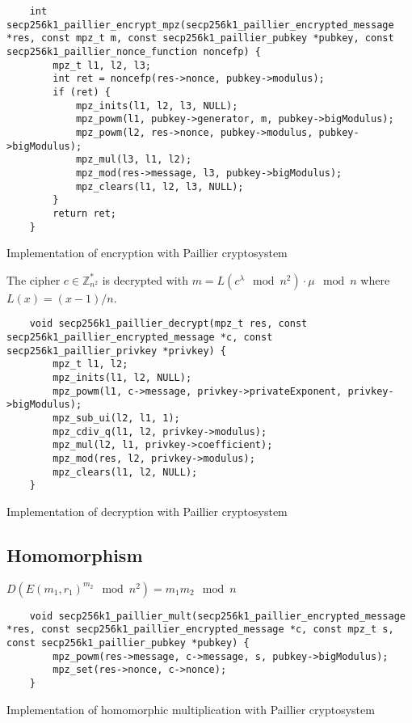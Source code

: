 \begin{listing}
  \begin{verbatim}
    int secp256k1_paillier_encrypt_mpz(secp256k1_paillier_encrypted_message *res, const mpz_t m, const secp256k1_paillier_pubkey *pubkey, const secp256k1_paillier_nonce_function noncefp) {
        mpz_t l1, l2, l3;
        int ret = noncefp(res->nonce, pubkey->modulus);
        if (ret) {
            mpz_inits(l1, l2, l3, NULL);
            mpz_powm(l1, pubkey->generator, m, pubkey->bigModulus);
            mpz_powm(l2, res->nonce, pubkey->modulus, pubkey->bigModulus);
            mpz_mul(l3, l1, l2);
            mpz_mod(res->message, l3, pubkey->bigModulus);
            mpz_clears(l1, l2, l3, NULL);
        }
        return ret;
    }
  \end{verbatim}
	\caption{Implementation of encryption with Paillier cryptosystem}
	\label{lst:implEncryptPaillier}
\end{listing}

The cipher $c \in \mathbb{Z}_{n^2}^*$ is decrypted with
$m = L(c^{\lambda} \mod n^2) \cdot \mu \mod n$ where $L(x) = (x - 1) / n$.

\begin{listing}
  \begin{verbatim}
    void secp256k1_paillier_decrypt(mpz_t res, const secp256k1_paillier_encrypted_message *c, const secp256k1_paillier_privkey *privkey) {
        mpz_t l1, l2;
        mpz_inits(l1, l2, NULL);
        mpz_powm(l1, c->message, privkey->privateExponent, privkey->bigModulus);
        mpz_sub_ui(l2, l1, 1);
        mpz_cdiv_q(l1, l2, privkey->modulus);
        mpz_mul(l2, l1, privkey->coefficient);
        mpz_mod(res, l2, privkey->modulus);
        mpz_clears(l1, l2, NULL);
    }
  \end{verbatim}
	\caption{Implementation of decryption with Paillier cryptosystem}
	\label{lst:implDecryptPaillier}
\end{listing}

\subsection{Homomorphism}

$D(E(m_1, r_1)^{m_2} \mod n^2) = m_1 m_2 \mod n$

\begin{listing}
  \begin{verbatim}
    void secp256k1_paillier_mult(secp256k1_paillier_encrypted_message *res, const secp256k1_paillier_encrypted_message *c, const mpz_t s, const secp256k1_paillier_pubkey *pubkey) {
        mpz_powm(res->message, c->message, s, pubkey->bigModulus);
        mpz_set(res->nonce, c->nonce);
    }
  \end{verbatim}
	\caption{Implementation of homomorphic multiplication with Paillier cryptosystem}
	\label{lst:implDecryptPaillier}
\end{listing}

